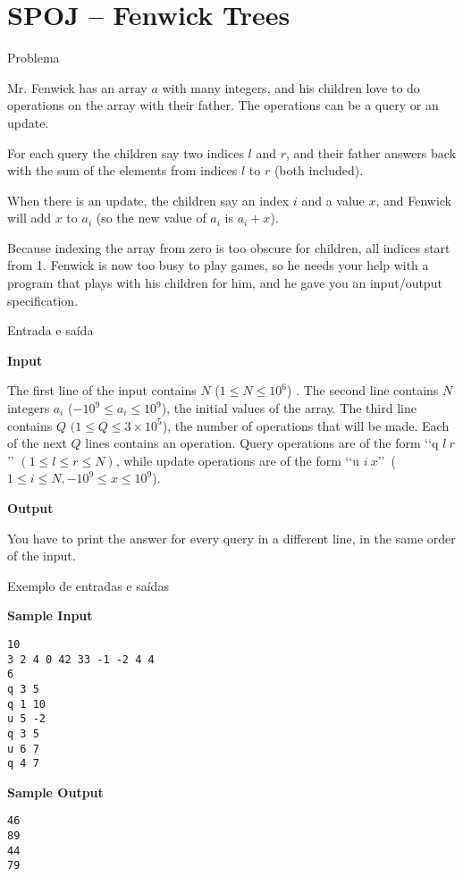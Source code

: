 \section{SPOJ -- Fenwick Trees}

\begin{frame}[fragile]{Problema}

Mr. Fenwick has an array $a$ with many integers, and his children love to do operations on the
array with their father. The operations can be a query or an update.

For each query the children say two indices $l$ and $r$, and their father answers back with the 
sum of the elements from indices $l$ to $r$ (both included).

When there is an update, the children say an index $i$ and a value $x$, and Fenwick will add $x$ to
$a_i$ (so the new value of $a_i$  is $a_i + x$).

Because indexing the array from zero is too obscure for children, all indices start from 1.
Fenwick is now too busy to play games, so he needs your help with a program that plays with his
children for him, and he gave you an input/output specification.

\end{frame}

\begin{frame}[fragile]{Entrada e saída}

\textbf{Input}

The first line of the input contains $N$ ($1\leq N\leq 10^6$) . The second line contains $N$ 
integers $a_i$ ($-10^9\leq a_i\leq 10^9$), the initial values of the array. The third line 
contains $Q$ $(1\leq Q\leq 3\times 10^5$), the number of operations that will be made. Each of the 
next $Q$ lines contains an operation.  Query operations are of the form \lq\lq q $l\ r$\rq\rq 
$(1\leq l\leq r\leq N)$, while update operations are of the form \lq\lq u $i\ x$\rq\rq\ 
($1\leq i\leq N, -10^9\leq x\leq 10^9$).

\textbf{Output}

You have to print the answer for every query in a different
line, in the same order of the input.

\end{frame}

\begin{frame}[fragile]{Exemplo de entradas e saídas}

\begin{minipage}[t]{0.5\textwidth}
\textbf{Sample Input}
\begin{verbatim}
10
3 2 4 0 42 33 -1 -2 4 4
6
q 3 5
q 1 10
u 5 -2
q 3 5
u 6 7
q 4 7
\end{verbatim}
\end{minipage}
\begin{minipage}[t]{0.45\textwidth}
\textbf{Sample Output}
\begin{verbatim}
46
89
44
79
\end{verbatim}
\end{minipage}
\end{frame}


